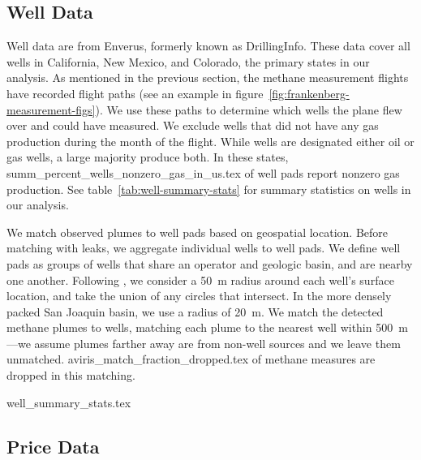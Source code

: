 \documentclass[12pt,oneside,letterpaper]{article}
\theoremstyle{definition}
\begin{document}
\begin{refsection}
\subsection{Well Data}
\label{sec:well-data}
Well data are from Enverus, formerly known as DrillingInfo.
These data cover all wells in California, New Mexico, and Colorado, the primary states in our analysis.
As mentioned in the previous section, the methane measurement flights have recorded flight paths (see an example in figure~\ref{fig:frankenberg-measurement-figs}).
We use these paths to determine which wells the plane flew over and could have measured.
We exclude wells that did not have any gas production during the month of the flight.
While wells are designated either oil or gas wells, a large majority produce both.
In these states,
{summ_percent_wells_nonzero_gas_in_us.tex}
of well pads report nonzero gas production.
See table~\ref{tab:well-summary-stats} for summary statistics on wells in our analysis.


We match observed plumes to well pads based on geospatial location.
Before matching with leaks, we aggregate individual wells to well pads.
We define well pads as groups of wells that share an operator and geologic basin, and are nearby one another.
Following \textcite{Omara/Zimmerman/Sullivan/Li/Ellis/Cesa/Subramanian/Presto/Robinson:2018}, we consider a 50~m radius around each well's surface location, and take the union of any circles that intersect.
In the more densely packed San Joaquin basin, we use a radius of 20~m.
We match the detected methane plumes to wells, matching each plume to the nearest well within 500~m---we assume plumes farther away are from non-well sources and we leave them unmatched.
{aviris_match_fraction_dropped.tex}
of methane measures are dropped in this matching.



\begin{table}[!hbt]
\centering
{well_summary_stats.tex}
\end{table}



\subsection{Price Data}
\label{sec:price-data}


\end{refsection}
\end{document}
